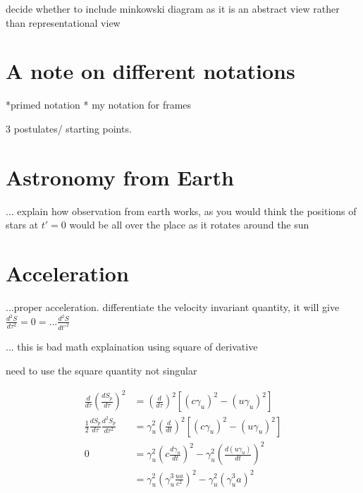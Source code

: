 decide whether to include minkowski diagram as it is an abstract view rather than representational view

\section{A note on different notations}
*primed notation
* my notation for frames

3 postulates/ starting points.

\section{Astronomy from Earth}

... explain how observation from earth works, as you would think the positions of stars at $t'=0$ would be all over the place as it rotates around the sun

\section{Acceleration}

...proper acceleration. differentiate the velocity invariant quantity, it will give \( \frac{d^2 S}{d\tau^2} = 0 = ...\frac{d^2 S}{dt{'}^2} \)

... this is bad math explaination using square of derivative

need to use the square quantity not singular

\begin{equation}
	\begin{aligned}
		\frac{d}{d\tau} \left(\frac{dS_p}{d\tau}\right)^2 & = \left(\frac{d}{d\tau}\right)^2 \left[ \left(c\gamma_{u}\right)^2-\left(u\gamma_{u} \right)^2 \right]                           \\
		\frac{1}{2} \frac{dS_p}{d\tau} \frac{d^2S_p}{d\tau^2}                               & = \gamma_u^2\left(\frac{d}{dt}\right)^2 \left[ \left(c\gamma_{u}\right)^2-\left(u\gamma_{u} \right)^2 \right]                           \\
		                                                              0   & = \gamma_u^2\left(c\frac{d \gamma_{u}}{dt}\right)^2-\gamma_u^2\left(\frac{d\left(u\gamma_{u} \right)}{dt}\right)^2 \\
																	  & = \gamma_u^2 \left( \gamma_u^3 \frac{u a}{{c}^2} \right)^2-\gamma_u^2\left( \gamma_u^3 a \right)^2
	\end{aligned}
\end{equation}

